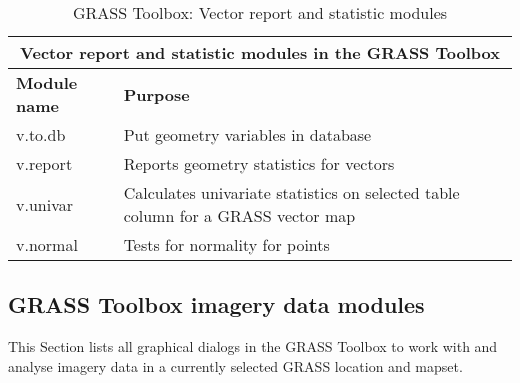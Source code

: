 \begin{table}[ht]
\centering
\caption{GRASS Toolbox: Vector report and statistic modules}\medskip
 \begin{tabular}{|p{4cm}|p{12cm}|}
  \hline \multicolumn{2}{|c|}{\textbf{Vector report and statistic modules in the GRASS
  Toolbox}} \\
  \hline \textbf{Module name} & \textbf{Purpose} \\
  \hline v.to.db & Put geometry variables in database \\
  \hline v.report & Reports geometry statistics for vectors \\
  \hline v.univar & Calculates univariate statistics on selected table column
  for a GRASS vector map \\
  \hline v.normal & Tests for normality for points\\
\hline
\end{tabular}
\end{table}

\clearpage

\subsection{GRASS Toolbox imagery data modules}

This Section lists all graphical dialogs in the GRASS Toolbox to work with
and analyse imagery data in a currently selected GRASS location and mapset.

